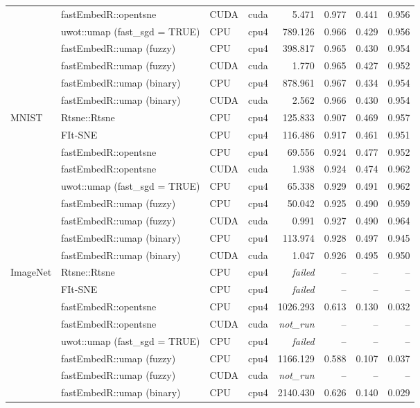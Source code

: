 {\begin{longtable}{p{}p{}llrrrr}
 & fastEmbedR::opentsne & CUDA & cuda & 5.471 & 0.977 & 0.441 & 0.956\\
 & uwot::umap (fast\_sgd = TRUE) & CPU & cpu4 & 789.126 & 0.966 & 0.429 & 0.956\\
 & fastEmbedR::umap (fuzzy) & CPU & cpu4 & 398.817 & 0.965 & 0.430 & 0.954\\
 & fastEmbedR::umap (fuzzy) & CUDA & cuda & 1.770 & 0.965 & 0.427 & 0.952\\
 & fastEmbedR::umap (binary) & CPU & cpu4 & 878.961 & 0.967 & 0.434 & 0.954\\
 & fastEmbedR::umap (binary) & CUDA & cuda & 2.562 & 0.966 & 0.430 & 0.954\\
\addlinespace[2pt]
MNIST & Rtsne::Rtsne & CPU & cpu4 & 125.833 & 0.907 & 0.469 & 0.957\\
 & FIt-SNE & CPU & cpu4 & 116.486 & 0.917 & 0.461 & 0.951\\
 & fastEmbedR::opentsne & CPU & cpu4 & 69.556 & 0.924 & 0.477 & 0.952\\
 & fastEmbedR::opentsne & CUDA & cuda & 1.938 & 0.924 & 0.474 & 0.962\\
 & uwot::umap (fast\_sgd = TRUE) & CPU & cpu4 & 65.338 & 0.929 & 0.491 & 0.962\\
 & fastEmbedR::umap (fuzzy) & CPU & cpu4 & 50.042 & 0.925 & 0.490 & 0.959\\
 & fastEmbedR::umap (fuzzy) & CUDA & cuda & 0.991 & 0.927 & 0.490 & 0.964\\
 & fastEmbedR::umap (binary) & CPU & cpu4 & 113.974 & 0.928 & 0.497 & 0.945\\
 & fastEmbedR::umap (binary) & CUDA & cuda & 1.047 & 0.926 & 0.495 & 0.950\\
\addlinespace[2pt]
ImageNet & Rtsne::Rtsne & CPU & cpu4 & \textit{failed} & -- & -- & --\\
 & FIt-SNE & CPU & cpu4 & \textit{failed} & -- & -- & --\\
 & fastEmbedR::opentsne & CPU & cpu4 & 1026.293 & 0.613 & 0.130 & 0.032\\
 & fastEmbedR::opentsne & CUDA & cuda & \textit{not\_run} & -- & -- & --\\
 & uwot::umap (fast\_sgd = TRUE) & CPU & cpu4 & \textit{failed} & -- & -- & --\\
 & fastEmbedR::umap (fuzzy) & CPU & cpu4 & 1166.129 & 0.588 & 0.107 & 0.037\\
 & fastEmbedR::umap (fuzzy) & CUDA & cuda & \textit{not\_run} & -- & -- & --\\
 & fastEmbedR::umap (binary) & CPU & cpu4 & 2140.430 & 0.626 & 0.140 & 0.029\\

\end{longtable}}
